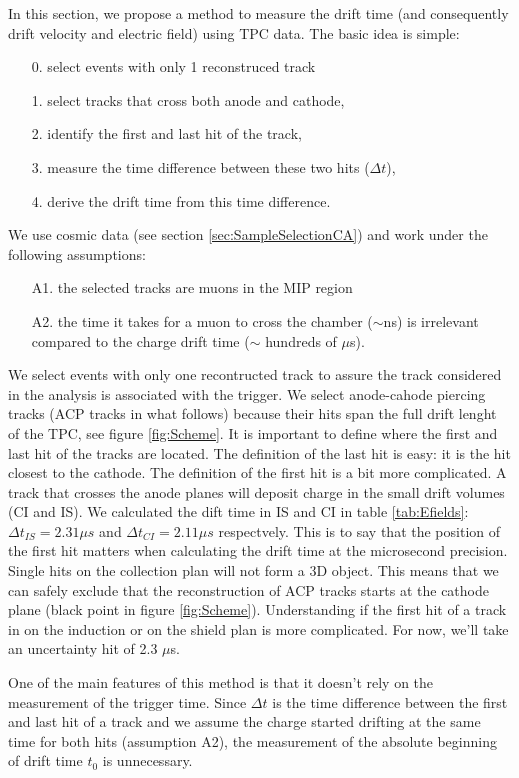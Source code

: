 In this section, we propose a method to measure the drift time (and consequently drift velocity and electric field) using TPC data.
The basic idea is simple:
\begin{itemize}
\item[0.] select events with only 1 reconstruced track 
\item[1.] select tracks that cross both anode and cathode,
\item[2.] identify the first and last hit of the track,
\item[3.] measure the time difference between these two hits ($\Delta t$),
\item[4.] derive the drift time from this time difference.
\end{itemize}
We use cosmic data (see section \ref{sec:SampleSelectionCA}) and work under the following assumptions: 
\begin{itemize}
\item [A1.] the selected tracks are muons in the MIP region
\item [A2.] the time it takes for a muon to cross the chamber ($\sim$ns) is irrelevant compared to the charge drift time ($\sim$ hundreds of $\mu$s).
\end{itemize}

We select events with only one recontructed track to assure the track considered in the analysis is associated with the trigger.
We select anode-cahode piercing tracks (ACP tracks in what follows) because their hits span the full drift lenght of the TPC, see figure \ref{fig:Scheme}. It is important to define where the first and last hit of the tracks are located. The definition of the last hit is easy: it is the hit closest to the cathode. The definition of the first hit is a bit more complicated. A track that crosses the anode planes will deposit charge in the small drift volumes (CI and IS). We calculated the dift time in IS and CI in table \ref{tab:Efields}: $\Delta t_{IS} = 2.31  \mu s$  and $\Delta t_{CI} = 2.11 \mu s $ respectvely. This is to say that the position of the first hit  matters when calculating the drift time at the microsecond precision.
Single hits on the collection plan will not form a 3D object. This means that we can safely exclude that the reconstruction of ACP tracks starts at the cathode plane (black point in figure \ref{fig:Scheme}). Understanding if the first hit of a track in on the induction or on the shield plan is more complicated. For now, we'll take an uncertainty hit of 2.3 $\mu$s.


One of the main features of this method is that it doesn't rely on the measurement of the trigger time. Since $\Delta t$ is the time difference between the first and last hit of a track and we assume the charge started drifting at the same time for both hits (assumption A2), the measurement of the absolute beginning of drift time $t_0$ is unnecessary. 


